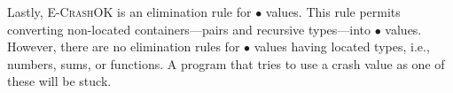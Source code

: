 \documentclass[10pt]{article}
\newcommand{\rulelab}[1]{{\small \textsc{#1}}}
\newcommand{\kw}[1]{\ensuremath{\mathtt{#1}}}
\newcommand{\epar}[2]{\ensuremath{\kw{par}~{#1}~{#2}}}
\newcommand{\vcrash}{\ensuremath{\bullet}}
\begin{document}
Lastly, \rulelab{E-CrashOK} is an elimination rule for $\vcrash$
values. This rule permits converting non-located containers---pairs
and recursive types---into $\vcrash$ values. However, there are no
elimination rules for $\vcrash$ values having located types, i.e.,
numbers, sums, or functions. A program that tries to use a crash value
as one of these will be stuck.





\end{document}
